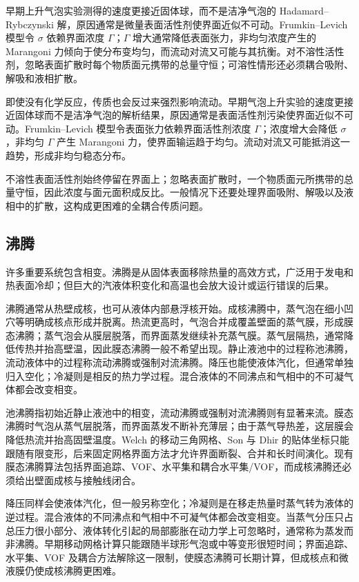 \documentclass[11pt,a4paper,openany,fontset=none]{ctexbook}
\begin{document}
早期上升气泡实验测得的速度更接近固体球，而不是洁净气泡的 Hadamard--Rybczynski 解，原因通常是微量表面活性剂使界面近似不可动。Frumkin--Levich 模型令 $\sigma$ 依赖界面浓度 $\Gamma$；$\Gamma$ 增大通常降低表面张力，非均匀浓度产生的 Marangoni 力倾向于使分布变均匀，而流动对流又可能与其抗衡。对不溶性活性剂，忽略表面扩散时每个物质面元携带的总量守恒；可溶性情形还必须耦合吸附、解吸和液相扩散。

即使没有化学反应，传质也会反过来强烈影响流动。早期气泡上升实验的速度更接近固体球而不是洁净气泡的解析结果，原因通常是表面活性剂污染使界面近似不可动。Frumkin--Levich 模型令表面张力依赖界面活性剂浓度 $\Gamma$；浓度增大会降低 $\sigma$，非均匀 $\Gamma$ 产生 Marangoni 力，使界面输运趋于均匀。流动对流又可能抵消这一趋势，形成非均匀稳态分布。

不溶性表面活性剂始终停留在界面上；忽略表面扩散时，一个物质面元所携带的总量守恒，因此浓度与面元面积成反比。一般情况下还要处理界面吸附、解吸以及液相中的扩散，这构成更困难的全耦合传质问题。

\subsection{沸腾}

许多重要系统包含相变。沸腾是从固体表面移除热量的高效方式，广泛用于发电和热表面冷却；但巨大的汽液体积变化和高温也会放大设计或运行错误的后果。

沸腾通常从热壁成核，也可从液体内部悬浮核开始。成核沸腾中，蒸气泡在细小凹穴等明确成核点形成并脱离。热流更高时，气泡合并成覆盖壁面的蒸气膜，形成膜态沸腾；蒸气泡会从膜层脱落，而界面蒸发继续补充蒸气膜。蒸气层隔热，通常降低传热并抬高壁温，因此膜态沸腾一般不希望出现。静止液池中的过程称池沸腾，流动液体中的过程称流动沸腾或强制对流沸腾。降压也能使液体汽化，但通常单独归入空化；冷凝则是相反的热力学过程。混合液体的不同沸点和气相中的不可凝气体都会改变相变。

池沸腾指初始近静止液池中的相变，流动沸腾或强制对流沸腾则有显著来流。膜态沸腾时气泡从蒸气层脱落，而界面蒸发不断补充薄层；由于蒸气导热差，这层膜会降低热流并抬高固壁温度。Welch 的移动三角网格、Son 与 Dhir 的贴体坐标只能跟随有限变形，后来固定网格界面方法才允许界面断裂、合并和长时间演化。现有膜态沸腾算法包括界面追踪、VOF、水平集和耦合水平集/VOF，而成核沸腾还必须给出壁面成核与接触线闭合。

降压同样会使液体汽化，但一般另称空化；冷凝则是在移走热量时蒸气转为液体的逆过程。混合液体的不同沸点和气相中不可凝气体都会改变相变。当蒸气分压只占总压力很小部分、液体转化引起的局部膨胀在动力学上可忽略时，通常称为蒸发而非沸腾。早期移动网格计算只能跟随半球形气泡或中等变形很短时间；界面追踪、水平集、VOF 及耦合方法解除这一限制，使膜态沸腾可长期计算，但成核点和微液膜仍使成核沸腾更困难。
\end{document}
